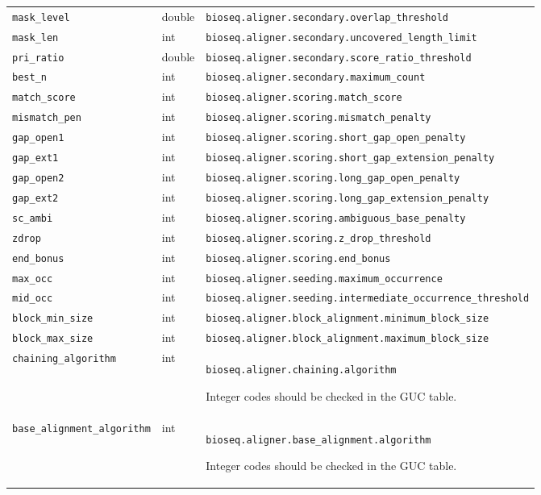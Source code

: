 \begin{longtable}{@{}>{\raggedright\arraybackslash}p{.28\linewidth}>{\raggedright\arraybackslash}p{.10\linewidth}>{\raggedright\arraybackslash}p{}@{}}
\nolinkurl{mask_level} & double & \nolinkurl{bioseq.aligner.secondary.overlap_threshold}\\[3pt]
\nolinkurl{mask_len} & int & \nolinkurl{bioseq.aligner.secondary.uncovered_length_limit}\\[3pt]
\nolinkurl{pri_ratio} & double & \nolinkurl{bioseq.aligner.secondary.score_ratio_threshold}\\[3pt]
\nolinkurl{best_n} & int & \nolinkurl{bioseq.aligner.secondary.maximum_count}\\[3pt]
\nolinkurl{match_score} & int & \nolinkurl{bioseq.aligner.scoring.match_score}\\[3pt]
\nolinkurl{mismatch_pen} & int & \nolinkurl{bioseq.aligner.scoring.mismatch_penalty}\\[3pt]
\nolinkurl{gap_open1} & int & \nolinkurl{bioseq.aligner.scoring.short_gap_open_penalty}\\[3pt]
\nolinkurl{gap_ext1} & int & \nolinkurl{bioseq.aligner.scoring.short_gap_extension_penalty}\\[3pt]
\nolinkurl{gap_open2} & int & \nolinkurl{bioseq.aligner.scoring.long_gap_open_penalty}\\[3pt]
\nolinkurl{gap_ext2} & int & \nolinkurl{bioseq.aligner.scoring.long_gap_extension_penalty}\\[3pt]
\nolinkurl{sc_ambi} & int & \nolinkurl{bioseq.aligner.scoring.ambiguous_base_penalty}\\[3pt]
\nolinkurl{zdrop} & int & \nolinkurl{bioseq.aligner.scoring.z_drop_threshold}\\[3pt]
\nolinkurl{end_bonus} & int & \nolinkurl{bioseq.aligner.scoring.end_bonus}\\[3pt]
\nolinkurl{max_occ} & int & \nolinkurl{bioseq.aligner.seeding.maximum_occurrence}\\[3pt]
\nolinkurl{mid_occ} & int & \nolinkurl{bioseq.aligner.seeding.intermediate_occurrence_threshold}\\[3pt]
\nolinkurl{block_min_size} & int & \nolinkurl{bioseq.aligner.block_alignment.minimum_block_size}\\[3pt]
\nolinkurl{block_max_size} & int & \nolinkurl{bioseq.aligner.block_alignment.maximum_block_size}\\[3pt]
\nolinkurl{chaining_algorithm} & int & \nolinkurl{bioseq.aligner.chaining.algorithm}\par Integer codes should be checked in the GUC table.\\[3pt]
\nolinkurl{base_alignment_algorithm} & int & \nolinkurl{bioseq.aligner.base_alignment.algorithm}\par Integer codes should be checked in the GUC table.\\[3pt]

\end{longtable}
